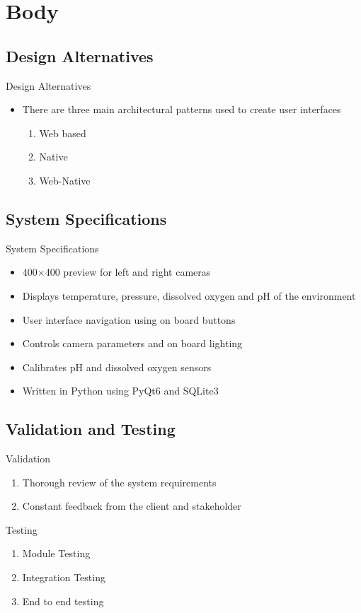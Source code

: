 \documentclass[17pt, aspectratio=169]{beamer}
\begin{document}
\section{Body}
\subsection*{Design Alternatives}
\begin{frame}{Design Alternatives}
	\begin{itemize}

		\item There are three main architectural patterns used to create user interfaces
		      \begin{enumerate}
			      \item Web based
			      \item Native
			      \item Web-Native
		      \end{enumerate}
	\end{itemize}
\end{frame}
\subsection*{System Specifications}
\begin{frame}{System Specifications}
	\begin{itemize}
		\item 400$\times$400 preview for left and right cameras
		\item Displays temperature, pressure, dissolved oxygen and pH of the environment
		\item User interface navigation using on board buttons
		\item Controls camera parameters and on board lighting
		\item Calibrates pH and dissolved oxygen sensors
		\item Written in Python using PyQt6 and SQLite3
	\end{itemize}
\end{frame}
\subsection*{Validation and Testing}
\begin{frame}{Validation}
	\begin{enumerate}
		\item Thorough review of the system requirements
		\item Constant feedback from the client and stakeholder
	\end{enumerate}
\end{frame}
\begin{frame}{Testing}
	\begin{enumerate}
		\item Module Testing
		\item Integration Testing
		\item End to end testing
	\end{enumerate}
\end{frame}
\end{document}
